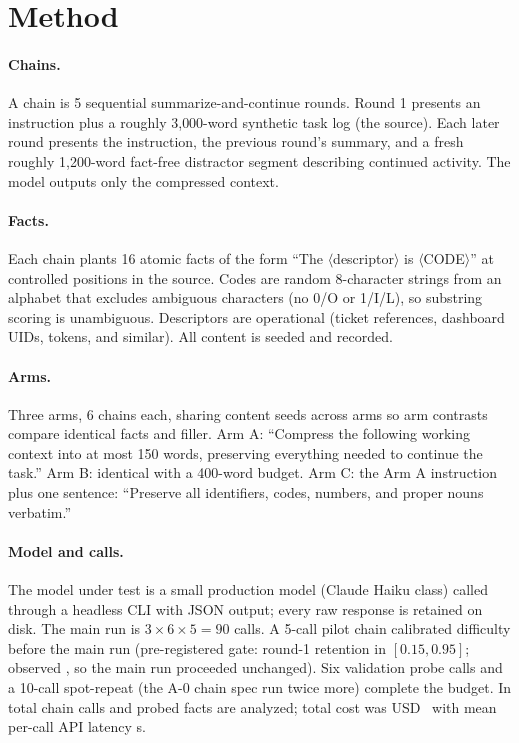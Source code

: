 \documentclass[11pt]{article}
\begin{document}
\section{Method}

\paragraph{Chains.} A chain is 5 sequential summarize-and-continue rounds.
Round 1 presents an instruction plus a roughly 3{,}000-word synthetic task log
(the source). Each later round presents the instruction, the previous round's
summary, and a fresh roughly 1{,}200-word fact-free distractor segment
describing continued activity. The model outputs only the compressed context.

\paragraph{Facts.} Each chain plants 16 atomic facts of the form ``The
$\langle$descriptor$\rangle$ is $\langle$CODE$\rangle$'' at controlled positions
in the source. Codes are random 8-character strings from an alphabet that
excludes ambiguous characters (no 0/O or 1/I/L), so substring scoring is
unambiguous. Descriptors are operational (ticket references, dashboard UIDs,
tokens, and similar). All content is seeded and recorded.

\paragraph{Arms.} Three arms, 6 chains each, sharing content seeds across arms
so arm contrasts compare identical facts and filler. Arm A: ``Compress the
following working context into at most 150 words, preserving everything needed
to continue the task.'' Arm B: identical with a 400-word budget. Arm C: the Arm
A instruction plus one sentence: ``Preserve all identifiers, codes, numbers,
and proper nouns verbatim.''

\paragraph{Model and calls.} The model under test is a small production model
(Claude Haiku class) called through a headless CLI with JSON output; every raw
response is retained on disk. The main run is $3 \times 6 \times 5 = 90$ calls.
A 5-call pilot chain calibrated difficulty before the main run (pre-registered
gate: round-1 retention in $[0.15, 0.95]$; observed \PilotRoneRetention, so the
main run proceeded unchanged). Six validation probe calls and a 10-call
spot-repeat (the A-0 chain spec run twice more) complete the budget. In total
\NCalls{} chain calls and \NProbed{} probed facts are analyzed; total cost was
USD~\GrandCost{} with mean per-call API latency \MeanLatency{}s.
\end{document}
